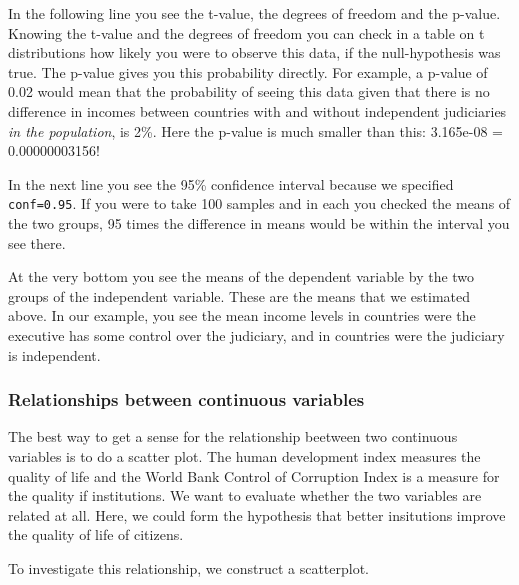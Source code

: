 \documentclass[]{article}
\newenvironment{Shaded}{\begin{snugshade}}{\end{snugshade}}
\newcommand{\DataTypeTok}[1]{\textcolor[rgb]{0.13,0.29,0.53}{#1}}
\newcommand{\DecValTok}[1]{\textcolor[rgb]{0.00,0.00,0.81}{#1}}
\newcommand{\KeywordTok}[1]{\textcolor[rgb]{0.13,0.29,0.53}{\textbf{#1}}}
\newcommand{\NormalTok}[1]{#1}
\newcommand{\OperatorTok}[1]{\textcolor[rgb]{0.81,0.36,0.00}{\textbf{#1}}}
\newcommand{\OtherTok}[1]{\textcolor[rgb]{0.56,0.35,0.01}{#1}}
\newcommand{\StringTok}[1]{\textcolor[rgb]{0.31,0.60,0.02}{#1}}
\begin{document}
In the following line you see the t-value, the degrees of freedom and the p-value. Knowing the t-value and the degrees of freedom you can check in a table on t distributions how likely you were to observe this data, if the null-hypothesis was true. The p-value gives you this probability directly. For example, a p-value of 0.02 would mean that the probability of seeing this data given that there is no difference in incomes between countries with and without independent judiciaries \emph{in the population}, is 2\%. Here the p-value is much smaller than this: 3.165e-08 = 0.00000003156!

In the next line you see the 95\% confidence interval because we specified \texttt{conf=0.95}. If you were to take 100 samples and in each you checked the means of the two groups, 95 times the difference in means would be within the interval you see there.

At the very bottom you see the means of the dependent variable by the two groups of the independent variable. These are the means that we estimated above. In our example, you see the mean income levels in countries were the executive has some control over the judiciary, and in countries were the judiciary is independent.

\hypertarget{relationships-between-continuous-variables}{%
\subsubsection{Relationships between continuous variables}\label{relationships-between-continuous-variables}}

The best way to get a sense for the relationship beetween two continuous variables is to do a scatter plot. The human development index measures the quality of life and the World Bank Control of Corruption Index is a measure for the quality if institutions. We want to evaluate whether the two variables are related at all. Here, we could form the hypothesis that better insitutions improve the quality of life of citizens.

To investigate this relationship, we construct a scatterplot.

\begin{Shaded}
\end{Shaded}
\end{document}
